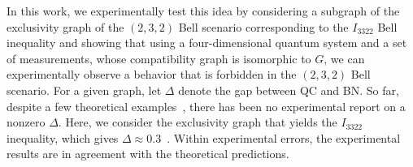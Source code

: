 \documentclass[prl,letterpaper,english,reprint,nofootinbib,aps,superscriptaddress,showpacs,showkeys]{revtex4-1}
\theoremstyle{definition}
\theoremstyle{remark}
\begin{document}
In this work, we experimentally test this idea by considering a subgraph of the exclusivity graph of the $(2,3,2)$ Bell scenario corresponding to the $I_{3322}$ Bell inequality and showing that using a four-dimensional quantum system and a set of measurements, whose compatibility graph is isomorphic to $G$, we can experimentally observe a behavior that is forbidden in the $(2,3,2)$ Bell scenario.
For a given graph, let $\Delta$ denote the gap
between QC and BN.
So far, despite a few theoretical examples~\cite{RDLTC14,SBBC13}, there has been no experimental report on a nonzero $\Delta$.
Here, we consider the exclusivity graph that yields the $I_{3322}$ inequality, which gives $\Delta\approx0.3$~\cite{RDLTC14}. Within experimental errors, the experimental results are in agreement with the theoretical predictions.

%
%
%
\end{document}
